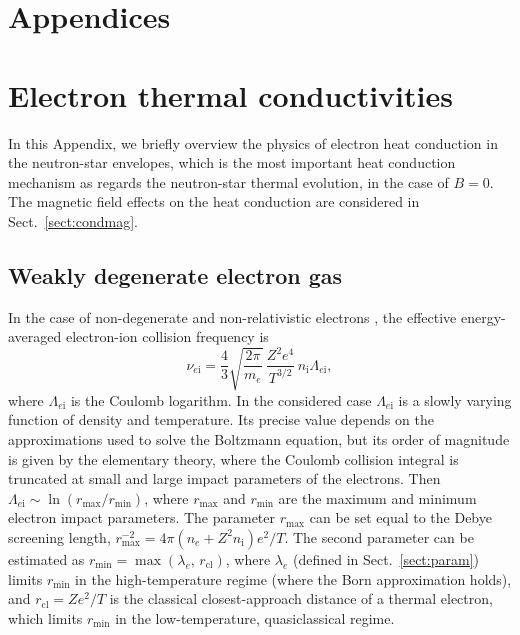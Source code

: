 \documentclass[smallextended]{svjour3}       %
\newcounter{count}
\newcommand{\lambde}{\lambda_e}
\newcommand{\mel}{m_e}
\newcommand{\nel}{n_e}
\newcommand{\nion}{n_\mathrm{i}}
\begin{document}
\begin{appendix}
\section*{Appendices}

\renewcommand{\thesection}{\Alph{section}.}
\renewcommand{\thesubsection}{\Alph{section}.\arabic{subsection}}

\section{Electron thermal conductivities}
\label{sect:conduct}
\renewcommand{\theequation}{A.\arabic{equation}}
\setcounter{equation}{0}

In this Appendix, we briefly overview the physics of
electron heat conduction in the neutron-star envelopes,
which is the most important heat conduction mechanism as
regards the neutron-star thermal evolution, in the case of
$B=0$.  The magnetic field effects on the heat conduction
are considered in Sect.~\ref{sect:condmag}.

\subsection{Weakly degenerate electron gas}
\label{sect:nondeg}

In the case of non-degenerate and non-relativistic electrons
\citep{SpitzerHarm,Braginskii58,Spitzer},
the effective energy-averaged electron-ion collision
frequency is
\begin{equation}
 \nu_{e\mathrm{i}} = \frac43 \sqrt{\frac{2\pi}{\mel}}
       \,\frac{Z^2 e^4}{T^{3/2}}
 \,\nion \Lambda_{e\mathrm{i}},
\label{nu_ei_nondeg}
\end{equation}
where  $\Lambda_{e\mathrm{i}}$ is the Coulomb logarithm. In
the considered case $\Lambda_{e\mathrm{i}}$ is a slowly
varying function of density and temperature. Its
precise value depends on the approximations used to solve
the Boltzmann equation, but its order of magnitude is given
by the elementary theory, where the Coulomb collision
integral is truncated at small and large impact parameters
of the electrons. Then
$\Lambda_{e\mathrm{i}}\sim\ln(r_{\mathrm{max}}/r_{\mathrm{min}})$,
where $r_{\mathrm{max}}$ and $r_{\mathrm{min}}$ are the
maximum and minimum electron impact parameters. The
parameter $r_{\mathrm{max}}$ can be set equal to the Debye
screening length, $r_{\mathrm{max}}^{-2}=4\pi (\nel +Z^2
\nion) e^2/T$. The second parameter can be estimated as
$r_{\mathrm{min}} = \max(\lambde,\,r_{\mathrm{cl}})$,
where $\lambde$ (defined in Sect.~\ref{sect:param}) limits
$r_{\mathrm{min}}$ in the high-temperature regime (where the
Born approximation holds), and $r_{\mathrm{cl}} = Ze^2/T$
is the classical closest-approach distance of a thermal
electron, which limits $r_{\mathrm{min}}$ in the
low-temperature, quasiclassical regime.


\end{appendix}
\end{document}
